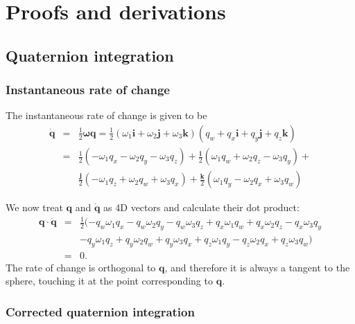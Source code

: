 \chapter{Proofs and derivations\label{proofs}}
\section{Quaternion integration\label{quatProofs}}
\subsection{Instantaneous rate of change\label{quatRateOfChangeOrthogonal}}
The instantaneous rate of change is given to be
\begin{eqnarray*}
\dot{\mathbf{q}} & = & \frac{1}{2}\mathbf{\omega q} =
    \frac{1}{2}(\omega_1\mathbf{i} + \omega_2\mathbf{j} + \omega_3\mathbf{k})
    (q_w + q_x\mathbf{i} + q_y\mathbf{j} + q_z\mathbf{k}) \\
& = & \frac{1}{2} ( - \omega_1 q_x - \omega_2 q_y - \omega_3 q_z ) +
    \frac{\mathbf{i}}{2} ( \omega_1 q_w + \omega_2 q_z - \omega_3 q_y ) + \\
&&  \frac{\mathbf{j}}{2} (-\omega_1 q_z + \omega_2 q_w + \omega_3 q_x ) +
    \frac{\mathbf{k}}{2} ( \omega_1 q_y - \omega_2 q_x + \omega_3 q_w )
\end{eqnarray*}

We now treat $\mathbf{q}$ and $\dot{\mathbf{q}}$ as 4D vectors and calculate
their dot product:
\begin{eqnarray*}
\mathbf{q}\cdot\dot{\mathbf{q}} & = & \frac{1}{2} (
    - q_w \omega_1 q_x - q_w \omega_2 q_y - q_w \omega_3 q_z
    + q_x \omega_1 q_w + q_x \omega_2 q_z - q_x \omega_3 q_y \\
&&  - q_y \omega_1 q_z + q_y \omega_2 q_w + q_y \omega_3 q_x
    + q_z \omega_1 q_y - q_z \omega_2 q_x + q_z \omega_3 q_w ) \\
& = & 0.
\end{eqnarray*}
The rate of change is orthogonal to $\mathbf{q}$, and therefore it is always
a tangent to the sphere, touching it at the point corresponding to $\mathbf{q}$.

\subsection{Corrected quaternion integration\label{quatIntegrationDerivation}}

